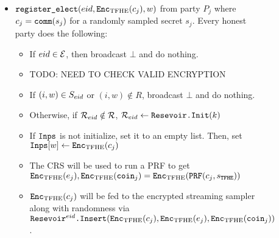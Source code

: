 \begin{figure}
{\begin{minipage}{1\textwidth}
\begin{itemize}
				\item $\texttt{register\_elect}({eid}, \texttt{Enc}_{\mathrm{TFHE}}(c_j), w)$ from party $P_j$ where $c_j = \texttt{comm}(s_j)$ for a randomly sampled secret $s_j$.
				Every honest party does the following:
				      \begin{itemize}
					      \item If ${eid} \in \mathcal{E}$, then broadcast $\bot$ and do nothing.
								\item TODO: NEED TO CHECK VALID ENCRYPTION
					      \item If $(i, w) \in S_{eid}$ or $(i, w) \notin R$, broadcast $\bot$ and do nothing.
					      \item Otherwise, if $\mathcal{R}_{eid} \notin \mathcal{R}$, $\mathcal{R}_{eid} \gets \texttt{Resevoir.Init}(k)$
								\item If $\texttt{Inps}$ is not initialize, set it to an empty list. Then, set $\texttt{Inps}[w] \gets \texttt{Enc}_{\mathrm{TFHE}}(c_j)$
					      \item The CRS will be used to run a PRF to get $\texttt{Enc}_{\mathrm{TFHE}}(e_j), \texttt{Enc}_{\mathrm{TFHE}}(\texttt{coin}_j) = \texttt{Enc}_{\mathrm{TFHE}}(\texttt{PRF}(c_j, s_\texttt{TFHE}))$
					      \item $\texttt{Enc}_{\mathrm{TFHE}}(c_j)$ will be fed to the encrypted streaming sampler along with randomness via
					            $\texttt{Resevoir}^{{eid}}\texttt{.Insert}(\texttt{Enc}_{\mathrm{TFHE}}(c_j), \texttt{Enc}_{\mathrm{TFHE}}(e_j), \texttt{Enc}_{\mathrm{TFHE}}(\texttt{coin}_j))$.
				      \end{itemize}


\end{itemize}
\end{minipage}}
\end{figure}
